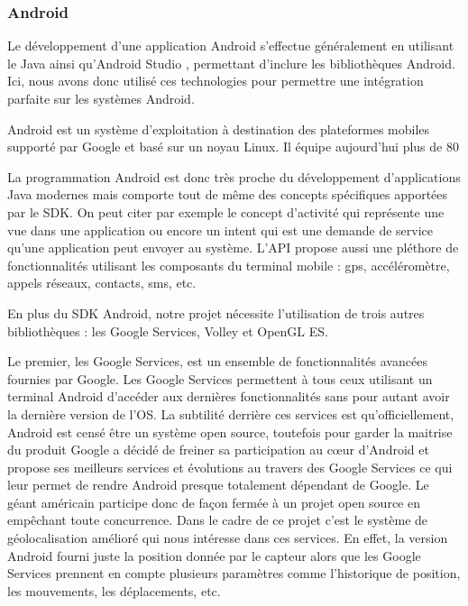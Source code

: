 \subsubsection{Android}

Le développement d'une application Android s'effectue généralement en utilisant le Java ainsi qu'Android Studio \cite{androidstudio}, permettant d'inclure les bibliothèques Android. Ici, nous avons donc utilisé ces technologies pour permettre une intégration parfaite sur les systèmes Android.

Android est un système d’exploitation à destination des plateformes mobiles supporté par Google et basé sur un noyau Linux. Il équipe aujourd’hui plus de 80%

La programmation Android est donc très proche du développement d’applications Java modernes mais comporte tout de même des concepts spécifiques apportées par le SDK. On peut citer par exemple le concept d’activité qui représente une vue dans une application ou encore un intent qui est une demande de service qu’une application peut envoyer au système. L’API propose aussi une pléthore de fonctionnalités utilisant les composants du terminal mobile : gps, accéléromètre, appels réseaux, contacts, sms, etc.

En plus du SDK Android, notre projet nécessite l’utilisation de trois autres bibliothèques : les Google Services, Volley et OpenGL ES. 

Le premier, les Google Services, est un ensemble de fonctionnalités avancées fournies par Google. Les Google Services permettent à tous ceux utilisant un terminal Android d’accéder aux dernières fonctionnalités sans pour autant avoir la dernière version de l’OS. La subtilité derrière ces services est qu’officiellement, Android est censé être un système open source, toutefois pour garder la maitrise du produit Google a décidé de freiner sa participation au cœur d’Android et propose ses meilleurs services et évolutions au travers des Google Services ce qui leur permet de rendre Android presque totalement dépendant de Google. Le géant américain participe donc de façon fermée à un projet open source en empêchant toute concurrence. Dans le cadre de ce projet c’est le système de géolocalisation amélioré qui nous intéresse dans ces services. En effet, la version Android fourni juste la position donnée par le capteur alors que les Google Services prennent en compte plusieurs paramètres comme l’historique de position, les mouvements, les déplacements, etc.

